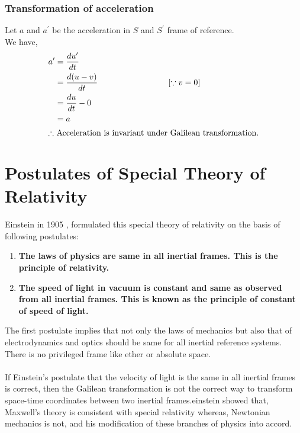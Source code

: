 \subsubsection{Transformation of acceleration}
Let $ a $ and  ${a}^{\prime}$  be the acceleration in ${S}$ and ${S}^{\prime}$ frame of reference.\\
We have, 
\begin{align*}
a^{\prime}&=\frac{d u^{\prime}}{d t}\\&=\frac{d(u-v)}{d t}\hspace{3cm} [\because v=0]\\&=\frac{d u}{d t}-0\\&=a\\
\intertext{$\therefore$ Acceleration is invariant under Galilean transformation.}
\end{align*}
\section{Postulates of Special Theory of Relativity}
Einstein in 1905 , formulated this special theory of relativity on the basis of following postulates:
\begin{enumerate}
	\item \textbf{The laws of physics are same in all inertial frames. This is the principle of relativity.}
	\item \textbf{The speed of light in vacuum is constant and same as observed from all inertial frames. This is known as the principle of constant of speed of light.}
\end{enumerate}

The first postulate implies that not only the laws of mechanics but also that of electrodynamics and optics should be same for all inertial reference systems. There is no privileged frame like ether or absolute space.\\\\
 If Einstein's postulate that the velocity of light is the same in all inertial frames  is correct, then the Galilean transformation is not the correct way to transform space-time coordinates between two inertial frames.einstein showed that, Maxwell's theory is consistent with special relativity whereas, Newtonian mechanics is not, and his modification of these branches of physics into accord.
